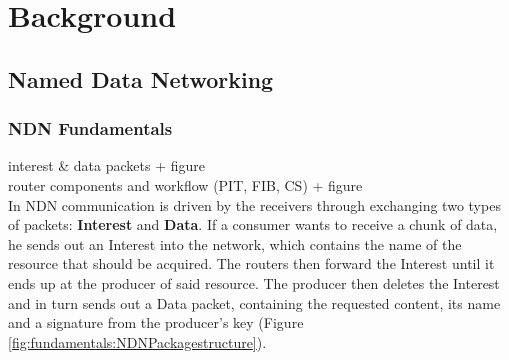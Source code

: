 \chapter{Background} \label{chapter:Background}



\section{Named Data Networking}

\subsection{NDN Fundamentals}

interest \& data packets + figure \\
router components and workflow (PIT, FIB, CS) + figure \\

 In NDN communication is driven by the receivers through exchanging two types of packets: \textbf{Interest} and \textbf{Data}. If a consumer wants to receive a chunk of data, he sends out an Interest into the network, which contains the name of the resource that should be acquired. The routers then forward the Interest until it ends up at the producer of said resource. The producer then deletes the Interest and in turn sends out a Data packet, containing the requested content, its name and a signature from the producer's key (Figure \ref{fig:fundamentals:NDNPackagestructure}). 

